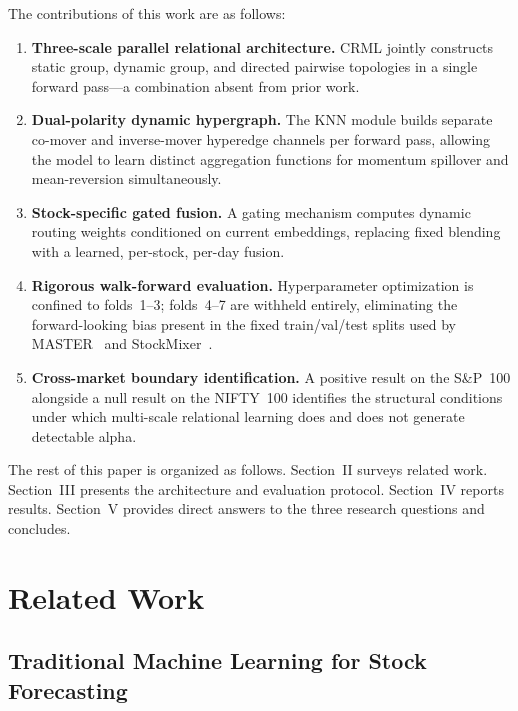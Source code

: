 \documentclass[journal]{IEEEtran}
\begin{document}
The contributions of this work are as follows:
\begin{enumerate}
\item \textbf{Three-scale parallel relational architecture.} CRML
jointly constructs static group, dynamic group, and directed pairwise
topologies in a single forward pass---a combination absent from prior
work.

\item \textbf{Dual-polarity dynamic hypergraph.} The KNN module builds
separate co-mover and inverse-mover hyperedge channels per forward pass,
allowing the model to learn distinct aggregation functions for momentum
spillover and mean-reversion simultaneously.

\item \textbf{Stock-specific gated fusion.} A gating mechanism computes
dynamic routing weights conditioned on current embeddings, replacing
fixed blending with a learned, per-stock, per-day fusion.

\item \textbf{Rigorous walk-forward evaluation.} Hyperparameter
optimization is confined to folds~1--3; folds~4--7 are withheld
entirely, eliminating the forward-looking bias present in the fixed
train/val/test splits used by MASTER~\cite{li2024master} and
StockMixer~\cite{fan2024stockmixer}.

\item \textbf{Cross-market boundary identification.} A positive result
on the S\&P~100 alongside a null result on the NIFTY~100 identifies the
structural conditions under which multi-scale relational learning does
and does not generate detectable alpha.
\end{enumerate}

The rest of this paper is organized as follows. Section~II surveys
related work. Section~III presents the architecture and evaluation
protocol. Section~IV reports results. Section~V provides direct answers
to the three research questions and concludes.

\section{Related Work}

\subsection{Traditional Machine Learning for Stock Forecasting}
\end{document}
